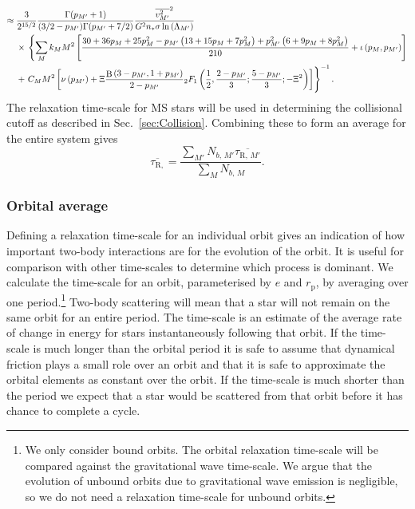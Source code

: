 \documentclass[useAMS,usedcolumn,usegraphicx,usenatbib]{mn2e}
\newcommand{\secref}[1]{Sec.~\ref{sec:#1}}
\DeclareMathOperator{\Beta}{B}
\newcommand{\sub}[1]{\ensuremath{_\mathrm{#1}}}
\newcommand{\recip}[1]{\ensuremath{\dfrac{1}{#1}}}
\begin{document}
\begin{onecolumn}
\begin{align}
 \approx {} & \frac{3}{2^{15/2}}\frac{\Gamma(p_{M'} + 1)}{(3/2 - p_{M'})\Gamma(p_{M'} + 7/2)}\frac{\overline{v_{M'}^2}^2}{G^2n_\ast\sigma\ln\left(\Lambda_{M'}\right)} \nonumber \\* 
  & \times {} \left\{\sum_M k_M M^2 \left[ \frac{30 + 36p_M + 25p_M^2 - p_{M'}\left(13 + 15p_M + 7 p_M^2\right) + p_{M'}^2\left(6 + 9p_M + 8p_M^2\right)}{210} + \iota \left(p_M,p_{M'}\right)\right] \right. \nonumber \\*
  & + \left. \vphantom{ \left[ \frac{p_{M'}^2\left(6 + 9p_M + 8p_M^2\right)}{210}\right]} C_M M^2 \left[\nu\left(p_{M'}\right) + \Xi\frac{\Beta\left(3-p_{M'},1+p_{M'}\right)}{2-p_{M'}}{_2F_1}\left(\recip{2},\frac{2-p_{M'}}{3};\frac{5-p_{M'}}{3};-\Xi^2\right)\right]\right\}^{-1}.
\end{align}
The relaxation time-scale for MS stars will be used in determining the collisional cutoff as described in \secref{Collision}. Combining these to form an average for the entire system gives
\begin{equation}
\overline{\tau_{\mathrm{R,}}} = \frac{\sum_{M'}N_{b,\,M'}\overline{\tau_{\mathrm{R,}\,M'}}}{\sum_{M}N_{b,\,M}}.
\end{equation}

\subsubsection{Orbital average}

Defining a relaxation time-scale for an individual orbit gives an indication of how important two-body interactions are for the evolution of the orbit. It is useful for comparison with other time-scales to determine which process is dominant. We calculate the time-scale for an orbit, parameterised by $e$ and $r\sub{p}$, by averaging over one period.\footnote{We only consider bound orbits. The orbital relaxation time-scale will be compared against the gravitational wave time-scale. We argue that the evolution of unbound orbits due to gravitational wave emission is negligible, so we do not need a relaxation time-scale for unbound orbits.}  Two-body scattering will mean that a star will not remain on the same orbit for an entire period. The time-scale is an estimate of the average rate of change in energy for stars instantaneously following that orbit. If the time-scale is much longer than the orbital period it is safe to assume that dynamical friction plays a small role over an orbit and that it is safe to approximate the orbital elements as constant over the orbit. If the time-scale is much shorter than the period we expect that a star would be scattered from that orbit before it has chance to complete a cycle.


\end{onecolumn}
\end{document}
